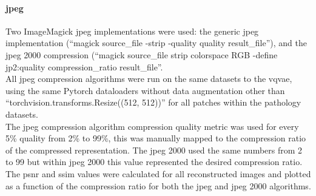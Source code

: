 \documentclass[review]{elsarticle}
\begin{document}



    
\paragraph{\gls{jpeg}} Two ImageMagick \gls{jpeg} implementations were used: the generic \gls{jpeg} implementation (``magick {source\_file} -strip -quality {quality} {result\_file}''),
 and the \gls{jpeg} 2000 compression (``magick {source\_file} \-strip \-colorspace RGB -define jp2:quality {compression\_ratio} {result\_file}''. \\
 All \gls{jpeg} compression algorithms were run on the same datasets to the \gls{vqvae}, using the same Pytorch dataloaders without data augmentation other than “torchvision.transforms.Resize((512, 512))” for all patches within the pathology datasets. \\
 The \gls{jpeg} compression algorithm compression quality metric was used for every 5\% quality from 2\% to 99\%, this was manually mapped to the compression ratio of the compressed representation. The \gls{jpeg} 2000 used the same numbers from 2 to 99 but within \gls{jpeg} 2000 this value represented the desired compression ratio. The \gls{psnr} and \gls{ssim} values were calculated for all reconstructed images and plotted as a function of the compression ratio for both the \gls{jpeg} and \gls{jpeg} 2000 algorithms.
\end{document}
